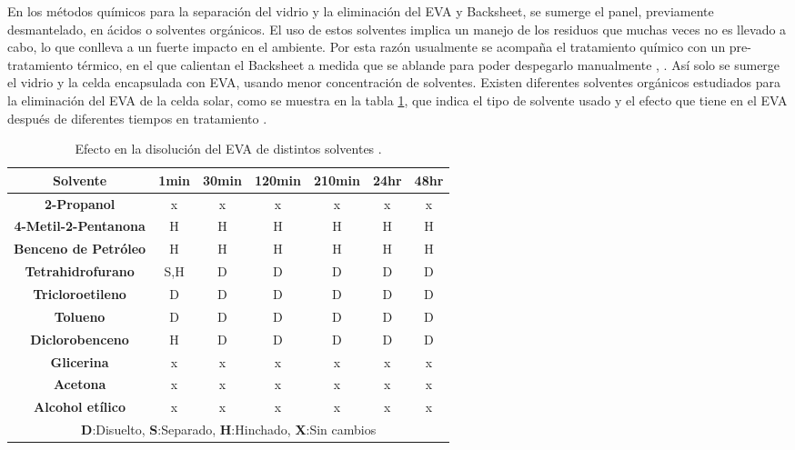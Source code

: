 En los métodos químicos para la separación del vidrio y la eliminación del EVA y Backsheet, se sumerge el panel, previamente desmantelado, en ácidos o solventes orgánicos. El uso de estos solventes implica un manejo de los residuos que muchas veces no es llevado a cabo, lo que conlleva a un fuerte impacto en el ambiente. Por esta razón usualmente se acompaña el tratamiento químico con un pre-tratamiento térmico, en el que calientan el Backsheet a medida que se ablande para poder despegarlo manualmente \citep{Azeumo2019}, \citep{Pagnanelli2019}. Así solo se sumerge el vidrio y la celda encapsulada con EVA, usando menor concentración de solventes. Existen diferentes solventes orgánicos estudiados para la eliminación del EVA de la celda solar, como se muestra en la tabla \ref{tab:efecto de sol}, que indica el tipo de solvente usado y el efecto que tiene en el EVA después de diferentes tiempos en tratamiento \citep{Sukmin2007}. 

\begin{table}[htb]
	\caption{Efecto en la disolución del EVA de distintos solventes \citep{Sukmin2007}. }
	\vspace{-0.5em} %
	\label{tab:efecto de sol}
	\begin{center}
		\begin{tabular}{c||c|c|c|c|c|c}\hline
			\textbf{Solvente} & \textbf{1min} & \textbf{30min} & \textbf{120min} & \textbf{210min} & \textbf{24hr} & \textbf{48hr} \\ \hline
			\textbf{2-Propanol} & x & x & x & x & x & x  \\ 
			\textbf{4-Metil-2-Pentanona} & H & H & H & H & H & H \\
			\textbf{Benceno de Petróleo} & H & H & H & H & H & H \\ 
			\textbf{Tetrahidrofurano} & S,H & D & D & D & D & D \\	
			\textbf{Tricloroetileno} & D & D & D & D & D & D \\
			\textbf{Tolueno} & D & D & D & D & D & D \\
			\textbf{Diclorobenceno} & H & D & D & D & D & D \\
			\textbf{Glicerina} & x & x & x & x & x & x  \\
			\textbf{Acetona} & x & x & x & x & x & x  \\
			\textbf{Alcohol etílico} & x & x & x & x & x & x  \\ \hline
			\multicolumn{7}{c}{\textbf{D}:Disuelto, \textbf{S}:Separado, \textbf{H}:Hinchado, \textbf{X}:Sin cambios } \\ \hline
		\end{tabular}
	\end{center}
\end{table}
 
